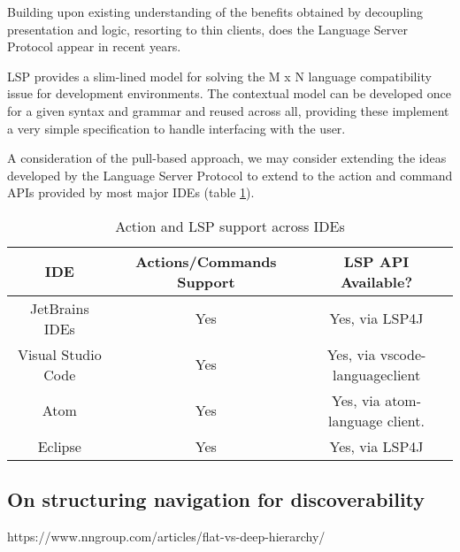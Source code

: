 Building upon existing understanding of the benefits obtained by decoupling presentation and logic, resorting to thin clients, does the Language Server Protocol \parencite{lspGitHubSiteMSFT} appear in recent years.

LSP provides a slim-lined model for solving the M x N language compatibility issue for development environments. The contextual model can be developed once for a given syntax and grammar and reused across all, providing these implement a very simple specification to handle interfacing with the user.

A consideration of the pull-based approach, we may consider extending the ideas developed by the Language Server Protocol to extend to the action and command APIs provided by most major IDEs (table \ref{table:1}).

\begin{table}[h!]
	\centering
	\begin{tabular}{ | c | c | c |}
		\hline
		IDE & Actions/Commands Support & LSP API Available?\\
		\hline
		\hline
		JetBrains IDEs & Yes & Yes, via LSP4J\\ 
		Visual Studio Code & Yes & Yes, via vscode-languageclient \\
		Atom & Yes & Yes, via atom-language client.\\
		Eclipse & Yes & Yes, via LSP4J\\
		\hline
	\end{tabular}
	\caption{Action and LSP support across IDEs}
	\label{table:1}
\end{table}

\subsection{On structuring navigation for discoverability}

https://www.nngroup.com/articles/flat-vs-deep-hierarchy/